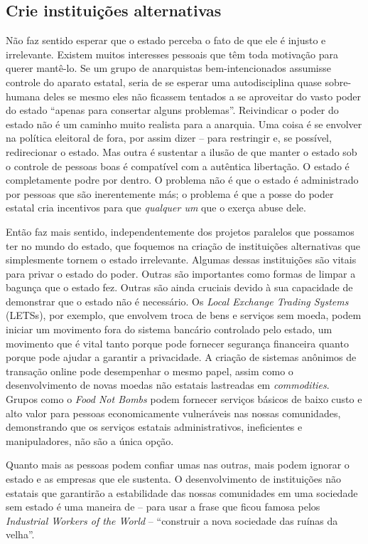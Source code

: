 \subsection*{Crie instituições alternativas}

Não faz sentido esperar que o estado perceba o fato de que ele é injusto e irrelevante. Existem muitos interesses pessoais que têm toda motivação para querer mantê-lo. Se um grupo de anarquistas bem-intencionados assumisse controle do aparato estatal, seria de se esperar uma autodisciplina quase sobre-humana deles se mesmo eles não ficassem tentados a se aproveitar do vasto poder do estado ``apenas para consertar alguns problemas''. Reivindicar o poder do estado não é um caminho muito realista para a anarquia. Uma coisa é se envolver na política eleitoral de fora, por assim dizer -- para restringir e, se possível, redirecionar o estado. Mas outra é sustentar a ilusão de que manter o estado sob o controle de pessoas boas é compatível com a autêntica libertação. O estado é completamente podre por dentro. O problema não é que o estado é administrado por pessoas que são inerentemente más; o problema é que a posse do poder estatal cria incentivos para que \emph{qualquer um} que o exerça abuse dele.

Então faz mais sentido, independentemente dos projetos paralelos que possamos ter no mundo do estado, que foquemos na criação de instituições alternativas que simplesmente tornem o estado irrelevante. Algumas dessas instituições são vitais para privar o estado do poder. Outras são importantes como formas de limpar a bagunça que o estado fez. Outras são ainda cruciais devido à sua capacidade de demonstrar que o estado não é necessário. Os \emph{Local Exchange Trading Systems} (LETSs), por exemplo, que envolvem troca de bens e serviços sem moeda, podem iniciar um movimento fora do sistema bancário controlado pelo estado, um movimento que é vital tanto porque pode fornecer segurança financeira quanto porque pode ajudar a garantir a privacidade. A criação de sistemas anônimos de transação online pode desempenhar o mesmo papel, assim como o desenvolvimento de novas moedas não estatais lastreadas em \emph{commodities}. Grupos como o \emph{Food Not Bombs} podem fornecer serviços básicos de baixo custo e alto valor para pessoas economicamente vulneráveis nas nossas comunidades, demonstrando que os serviços estatais administrativos, ineficientes e manipuladores, não são a única opção.

Quanto mais as pessoas podem confiar umas nas outras, mais podem ignorar o estado e as empresas que ele sustenta. O desenvolvimento de instituições não estatais que garantirão a estabilidade das nossas comunidades em uma sociedade sem estado é uma maneira de -- para usar a frase que ficou famosa pelos \emph{Industrial Workers of the World} -- ``construir a nova sociedade das ruínas da velha''.

